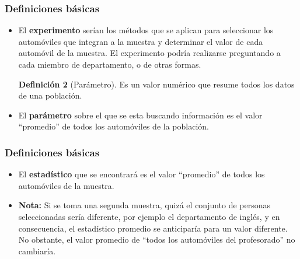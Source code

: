 \documentclass[10pt]{beamer}
\theoremstyle{plain} %
\theoremstyle{definition}
\newtheorem{defn}{Definición}
\theoremstyle{remark}
\begin{document}
\begin{frame}
\frametitle{Definiciones básicas}
\begin{itemize}[<+->]
\justifying
\begin{defn}[Experimento]
Es una actividad planeada cuyos resultados producen un conjunto de datos.
\end{defn}

\item El \textbf{experimento} serían los métodos que se aplican para seleccionar los automóviles que integran a la muestra y determinar el valor de cada automóvil de la muestra. El experimento podría realizarse preguntando a cada miembro de departamento, o de otras formas.

\begin{defn}[Parámetro]
Es un valor numérico que resume todos los datos de una población.
\end{defn}

\item El \textbf{parámetro} sobre el que se esta buscando información es el valor ``promedio'' de todos los automóviles de la población.
\end{itemize}
\end{frame}





\begin{frame}
\frametitle{Definiciones básicas}
\begin{itemize}[<+->]
\justifying
\begin{defn}[Estadístico]
Es un valor numérico que resume los datos de una muestra.
\end{defn}

\item El \textbf{estadístico} que se encontrará es el valor ``promedio'' de todos los automóviles de la muestra.

\item \textbf{Nota:} Si se toma una segunda muestra, quizá el conjunto de personas seleccionadas sería diferente, por ejemplo el departamento de inglés, y en consecuencia, el estadístico promedio se anticiparía para un valor diferente. No obstante, el valor promedio de ``todos los automóviles del profesorado'' no cambiaría.
\end{itemize}
\end{frame}
\end{document}
